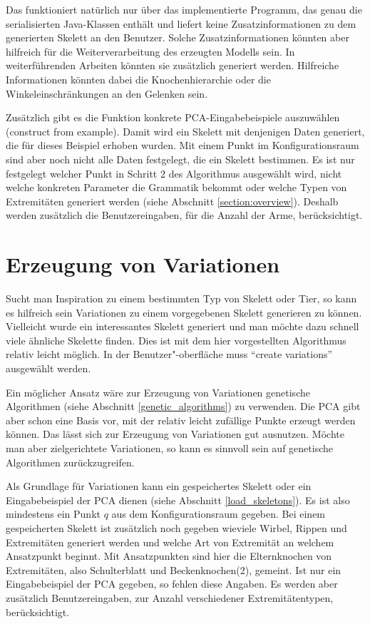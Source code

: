 Das funktioniert natürlich nur über das implementierte Programm, das genau die serialisierten Java-Klassen enthält und liefert keine Zusatzinformationen zu dem generierten Skelett an den Benutzer. Solche Zusatzinformationen könnten aber hilfreich für die Weiterverarbeitung des erzeugten Modells sein. In weiterführenden Arbeiten könnten sie zusätzlich generiert werden. Hilfreiche Informationen könnten dabei \zb die Knochenhierarchie oder die Winkeleinschränkungen an den Gelenken sein.

Zusätzlich gibt es die Funktion konkrete PCA-Eingabebeispiele auszuwählen (construct from example). Damit wird ein Skelett mit denjenigen Daten generiert, die für dieses Beispiel erhoben wurden. Mit einem Punkt im Konfigurationsraum sind aber noch nicht alle Daten festgelegt, die ein Skelett bestimmen. Es ist nur festgelegt welcher Punkt in Schritt $2$ des Algorithmus ausgewählt wird, nicht welche konkreten Parameter die Grammatik bekommt oder welche Typen von Extremitäten generiert werden (siehe Abschnitt \ref{section:overview}). Deshalb werden zusätzlich die Benutzereingaben, \zb für die Anzahl der Arme, berücksichtigt.


\section{Erzeugung von Variationen}
\label{variations}

Sucht man Inspiration zu einem bestimmten Typ von Skelett oder Tier, so kann es hilfreich sein Variationen zu einem vorgegebenen Skelett generieren zu können. 
Vielleicht wurde ein interessantes Skelett generiert und man möchte dazu schnell viele ähnliche Skelette finden.
Dies ist mit dem hier vorgestellten Algorithmus relativ leicht möglich. In der Benutzer"-oberfläche muss "`create variations"' ausgewählt werden.

Ein möglicher Ansatz wäre zur Erzeugung von Variationen genetische Algorithmen (siehe Abschnitt \ref{genetic_algorithms}) zu verwenden. Die PCA gibt aber schon eine Basis vor, mit der relativ leicht zufällige Punkte erzeugt werden können. Das lässt sich zur Erzeugung von Variationen gut ausnutzen. Möchte man aber zielgerichtete Variationen, so kann es sinnvoll sein auf genetische Algorithmen zurückzugreifen.

Als Grundlage für Variationen kann ein gespeichertes Skelett oder ein Eingabebeispiel der PCA dienen (siehe Abschnitt \ref{load_skeletons}). Es ist also mindestens ein Punkt $q$ aus dem Konfigurationsraum gegeben. Bei einem gespeicherten Skelett ist zusätzlich noch gegeben wieviele Wirbel, Rippen und Extremitäten generiert werden und welche Art von Extremität an welchem Ansatzpunkt beginnt. Mit Ansatzpunkten sind hier die Elternknochen von Extremitäten, also Schulterblatt und Beckenknochen(2), gemeint.
Ist nur ein Eingabebeispiel der PCA gegeben, so fehlen diese Angaben. Es werden aber zusätzlich Benutzereingaben, \zb zur Anzahl verschiedener Extremitätentypen, berücksichtigt.

